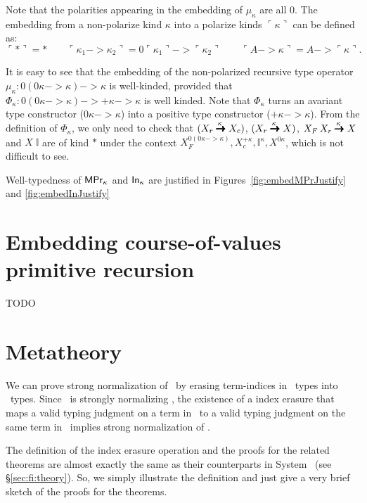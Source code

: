Note that the polarities appearing in the embedding of $\mu_\kappa$ are all
$0$. The embedding from a non-polarize kind $\kappa$ into
a polarize kinds $\ulcorner\kappa\urcorner$ can be defined as:
\[ \ulcorner * \urcorner = * \qquad
\ulcorner \kappa_1 -> \kappa_2 \urcorner =
0\ulcorner\kappa_1\urcorner -> \ulcorner\kappa_2\urcorner \qquad
\ulcorner A -> \kappa \urcorner = A -> \ulcorner \kappa \urcorner.
\]

It is easy to see that the embedding of the non-polarized recursive
type operator $\mu_\kappa : 0(0\kappa -> \kappa) -> \kappa$
is well-kinded, provided that
$\Phi_\kappa : 0(0\kappa -> \kappa) -> +\kappa -> \kappa$
is well kinded. Note that $\Phi_\kappa$ turns an avariant type constructor
($0\kappa -> \kappa$) into a positive type constructor
($+\kappa -> \kappa$). From the definition of $\Phi_\kappa$, we only need 
to check that $(X_r \stackrel{\kappa\;}{\pmb{\pmb{->}}} X_c)$, $(X_r \stackrel{\kappa\;}{\pmb{\pmb{->}}} X)$,
$X_F\,X_r \stackrel{\kappa\;}{\pmb{\pmb{->}}} X$ and $X\;\mathbb{I}$ are of kind $*$
under the context $ X_{\!F}^{0(0\kappa -> \kappa)},
		X_c^{+\kappa}, \mathbb{I}^\kappa, X^{0\kappa}$,
which is not difficult to see.

Well-typedness of $\mathsf{MPr}_\kappa$ and $\mathsf{In}_\kappa$ are justified in
Figures~\ref{fig:embedMPrJustify} and \ref{fig:embedInJustify}

\section{Embedding course-of-values primitive recursion}
\label{sec:fixi:cv}
TODO

\section{Metatheory} \label{sec:fixi:theory}

We can prove strong normalization of \Fixi\ by erasing term-indices in \Fixi\ 
types into \Fixw\ types. Since \Fixw\ is strongly normalizing \cite{AbeMat04},
the existence of a index erasure that maps a valid typing judgment on a term
in \Fixi\ to a valid typing judgment on the same term in \Fixw\ implies
strong normalization of \Fixi.

The definition of the index erasure operation and the proofs for
the related theorems are almost exactly the same as their counterparts
in System \Fi\ (see \S\ref{sec:fi:theory}). So, we simply illustrate
the definition and just give a very brief sketch of the proofs for the
theorems.

